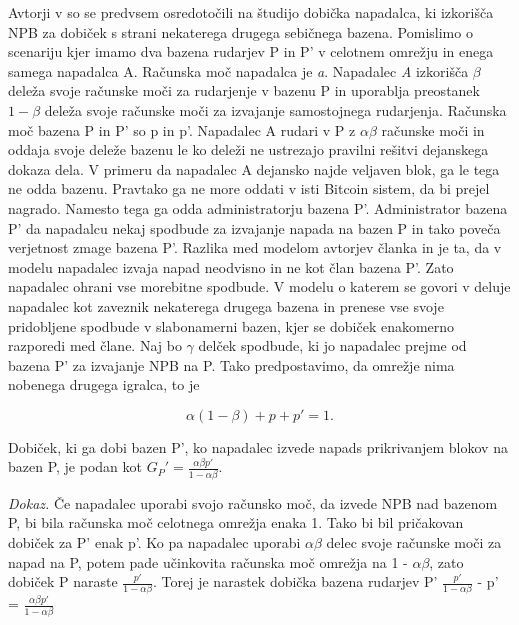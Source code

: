 \documentclass{acm_proc_article-sp}
\begin{document}
Avtorji v \cite{powersplitting} so se predvsem osredotočili na študijo dobička napadalca, ki izkorišča NPB za dobiček s strani nekaterega drugega sebičnega bazena. Pomislimo o scenariju kjer imamo dva bazena rudarjev P in P' v celotnem omrežju in enega samega napadalca A. Računska moč napadalca je \textit{a}. Napadalec \textit{A} izkorišča $\beta$ deleža svoje računske moči za rudarjenje v bazenu P in uporablja preostanek $1-\beta$ deleža svoje računske moči za izvajanje samostojnega rudarjenja. Računska moč bazena P in P' so p in p'. Napadalec A rudari v P  z $\alpha \beta $ računske moči in oddaja svoje deleže bazenu le ko deleži ne ustrezajo pravilni rešitvi dejanskega dokaza dela. V primeru da napadalec A dejansko najde veljaven blok, ga le tega ne odda bazenu. Pravtako ga ne more oddati v isti Bitcoin sistem, da bi prejel nagrado. Namesto tega ga odda administratorju bazena P'. Administrator bazena P' da napadalcu nekaj spodbude za izvajanje napada na bazen P in tako poveča verjetnost zmage bazena P'. Razlika med modelom avtorjev članka \cite{originalarticle} in \cite{minnersdilemma} je ta, da v modelu \cite{originalarticle} napadalec izvaja napad neodvisno in ne kot član bazena P'. Zato napadalec ohrani vse morebitne spodbude. V modelu o katerem se govori v \cite{minnersdilemma} deluje napadalec kot zaveznik nekaterega drugega bazena in prenese vse svoje pridobljene spodbude v slabonamerni bazen, kjer se dobiček enakomerno razporedi med člane. Naj bo $\gamma$ delček spodbude, ki jo napadalec prejme od bazena P' za izvajanje NPB na P. Tako predpostavimo, da omrežje nima nobenega drugega igralca, to je

\begin{equation} \label{equation:player}
\alpha(1-\beta) + p + p' = 1 .
\end{equation}

\begin{lema}
	Dobiček, ki ga dobi bazen P', ko napadalec izvede napads prikrivanjem blokov na bazen P, je podan kot  $ G_P$$'= \frac{\alpha \beta p'}{1-\alpha \beta}$.
\end{lema}
\noindent\textit{Dokaz.} Če napadalec uporabi svojo računsko moč, da izvede NPB nad bazenom P, bi bila računska moč celotnega omrežja enaka 1. Tako bi bil pričakovan dobiček za P'  enak p'. Ko pa napadalec uporabi \textit{ $\alpha \beta$} delec svoje računske moči za napad na P, potem pade učinkovita računska moč omrežja na 1 - $\alpha\beta$, zato  dobiček P naraste $\frac{p'}{ 1 - \alpha\beta}$.  Torej je narastek dobička bazena rudarjev P'  $\frac{p'}{1 - \alpha\beta}$ - p' = $\frac{\alpha\beta p'}{1 - \alpha\beta}$
\end{document}
